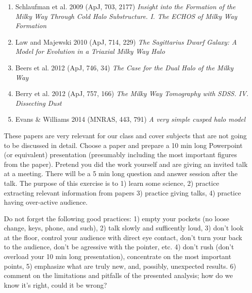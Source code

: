 \documentclass[10pt]{article}
\begin{document}
\begin{enumerate}
  {\it Light Curve Templates and Galactic Distribution of RR Lyrae Stars from Sloan Digital Sky Survey Stripe 82}
\item Schlaufman et al. 2009 (ApJ, 703, 2177)
  {\it Insight into the Formation of the Milky Way Through Cold Halo Substructure. I. The ECHOS of Milky Way Formation}
\item Law and Majewski 2010 (ApJ, 714, 229) 
 {\it The Sagittarius Dwarf Galaxy: A Model for Evolution in a Triaxial Milky Way Halo}
\item Beers et al. 2012 (ApJ, 746, 34) 
 {\it The Case for the Dual Halo of the Milky Way}
\item Berry et al. 2012 (ApJ, 757, 166)
 {\it The Milky Way Tomography with SDSS. IV. Dissecting Dust}
\item Evans \& Williams 2014 (MNRAS, 443, 791)
 {\it A very simple cusped halo model} 
\end{enumerate}


These papers are very relevant for our class and cover subjects that are
not going to be discussed in detail. Choose a paper and prepare a 10 min long 
Powerpoint (or equivalent) presentation
(presumably including the most important figures from the paper). Pretend 
you did the work yourself and are giving an invited talk at a meeting. 
There will be a 5 min long question and answer session after the talk. 
The purpose of this exercise is to 1) learn some science, 2) practice 
extracting relevant information from papers 3) practice giving talks,
4) practice having over-active audience.

Do not forget the following good practices: 1) empty your pockets (no loose 
change, keys, phone, and such),
2) talk slowly and sufficently loud, 3) don't look at the floor, control
your audience with direct eye contact, don't turn your back to the audience, 
don't be agressive with the pointer, etc. 4) don't rush (don't overload 
your 10 min long presentation), concentrate on the most important points,
5) emphasize what are truly new, and, possibly, unexpected results.
6) comment on the limitations and pitfalls of the presented analysis;
how do we know it's right, could it be wrong?
\end{document}
